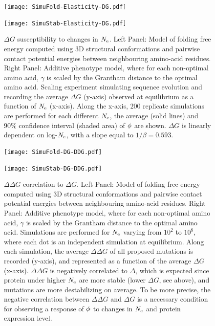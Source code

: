 \begin{figure}[H]
	\centering
	\begin{minipage}{0.49\linewidth}
		\texttt{[image: SimuFold-Elasticity-DG.pdf]}
	\end{minipage}%
	\hfill
	\begin{minipage}{0.49\linewidth}
		\texttt{[image: SimuStab-Elasticity-DG.pdf]}
	\end{minipage}
	\caption[$\Delta G$ susceptibility to changes in $\Ne$]{
		$\Delta G$ susceptibility to changes in $\Ne$.
		Left Panel: Model of folding free energy computed using 3D structural conformations and pairwise contact potential energies between neighbouring amino-acid residues. 
		Right Panel: Additive phenotype model, where for each non-optimal amino acid, $\gamma$ is scaled by the Grantham distance to the optimal amino acid.
		Scaling experiment simulating sequence evolution and recording the average $\Delta G$ (y-axis) observed at equilibrium as a function of $\Ne$ (x-axis).
		Along the x-axis, $200$ replicate simulations are performed for each different $\Ne$, the average (solid lines) and $90\%$ confidence interval (shaded area) of $\phi$ are shown.
		$\Delta G$ is linearly dependent on log-$\Ne$, with a slope equal to $1/\beta=0.593$.
	}
\end{figure}

\begin{figure}[H]
	\centering
	\begin{minipage}{0.49\linewidth}
		\texttt{[image: SimuFold-DG-DDG.pdf]}
	\end{minipage}%
	\hfill
	\begin{minipage}{0.49\linewidth}
		\texttt{[image: SimuStab-DG-DDG.pdf]}
	\end{minipage}

	\caption[$\Delta \Delta G$ correlation to $\Delta G$]{
		$\Delta \Delta G$ correlation to $\Delta G$.
		Left Panel: Model of folding free energy computed using 3D structural conformations and pairwise contact potential energies between neighbouring amino-acid residues. 
		Right Panel: Additive phenotype model, where for each non-optimal amino acid, $\gamma$ is scaled by the Grantham distance to the optimal amino acid.
		Simulations are performed for $\Ne$ varying from $10^2$ to $10^8$, where each dot is an independent simulation at equilibrium.
		Along each simulation, the average $\Delta \Delta G$ of all proposed mutations is recorded (y-axis), and represented as a function of the average $\Delta G$ (x-axis).
		$\Delta \Delta G$ is negatively correlated to $\Delta$, which is expected since protein under higher $\Ne$ are more stable (lower $\Delta G$, see above), and mutations are more destabilizing on average.
		To be more precise, the negative correlation between $\Delta \Delta G$ and $\Delta G$ is a necessary condition for observing a response of $\phi$ to changes in $\Ne$ and protein expression level\citep{Serohijos2012, Goldstein2013}. 
	}
\end{figure}

